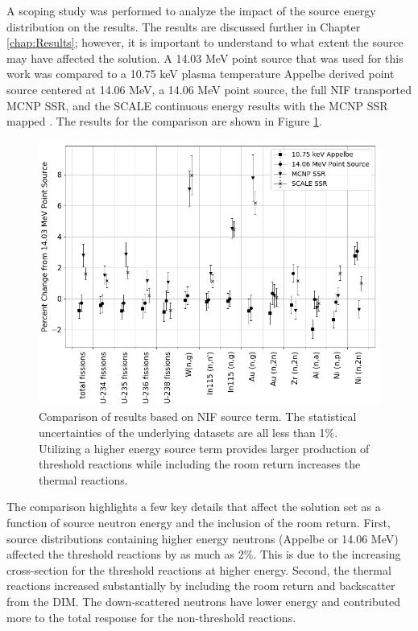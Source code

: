 A scoping study was performed to analyze the impact of the source energy distribution on the results. 
The results are discussed further in Chapter \ref{chap:Results}; however, it is important to understand to what extent the source may have affected the solution. 
A 14.03 MeV point source that was used for this work was compared to a 10.75 keV plasma temperature Appelbe derived point source centered at 14.06 MeV, a 14.06 MeV  point source, the full NIF transported MCNP SSR, and the SCALE continuous energy results with the MCNP SSR mapped \cite{Appelbe2014}. 
The results for the comparison are shown in Figure \ref{fig:srccomp}. 

\begin{figure}[ht]
	\includegraphics[width=\linewidth]{Figures/Chapter3/SourceComp.png}
	\caption[Comparison of results based on NIF source term. The statistical uncertainties of the underlying datasets are all less than 1\%]{Comparison of results based on NIF source term. The statistical uncertainties of the underlying datasets are all less than 1\%. Utilizing a higher energy source term provides larger production of threshold reactions while including the room return increases the thermal reactions.}
	\label{fig:srccomp}
\end{figure}

The comparison highlights a few key details that affect the solution set as a function of source neutron energy and the inclusion of the room return. 
First, source distributions containing higher energy neutrons (Appelbe or 14.06 MeV) affected the threshold reactions by as much as 2\%. 
This is due to the increasing cross-section for the threshold reactions at higher energy.  
Second, the thermal reactions increased substantially by including the room return and backscatter from the DIM. 
The down-scattered neutrons have lower energy and contributed more to the total response for the non-threshold reactions. 

